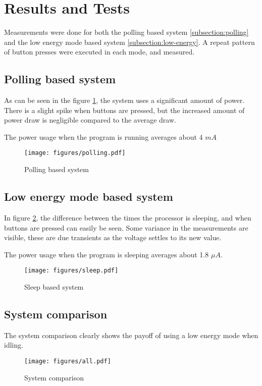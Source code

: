 \section{Results and Tests}

Measurements were done for both the polling based system \ref{subsection:polling} and the low energy mode based system \ref{subsection:low-energy}. A repeat pattern of button presses were executed in each mode, and measured.

\subsection{Polling based system}

As can be seen in the figure \ref{fig:polling-based-system}, the system uses a significant amount of power.
There is a slight spike when buttons are pressed, but the increased amount of power draw is negligible compared to the average draw.

The power usage when the program is running averages about 4 $m A$

\begin{figure}[h]
\centering
\texttt{[image: figures/polling.pdf]}
\caption{Polling based system}
\label{fig:polling-based-system}
\end{figure}

\subsection{Low energy mode based system}
In figure \ref{fig:sleep-based-system}, the difference between the times the processor is sleeping, and when buttons are pressed can easily be seen.
Some variance in the measurements are visible, these are due transients as the voltage settles to its new value.

The power usage when the program is sleeping averages about 1.8 $\mu A$.

\begin{figure}[h]
\centering
\texttt{[image: figures/sleep.pdf]}
\caption{Sleep based system}
\label{fig:sleep-based-system}
\end{figure}

\subsection{System comparison}

The system comparison clearly shows the payoff of using a low energy mode when idling.



\begin{figure}[h]
\centering
\texttt{[image: figures/all.pdf]}
\caption{System comparison}
\label{fig:system-comparison}
\end{figure}
